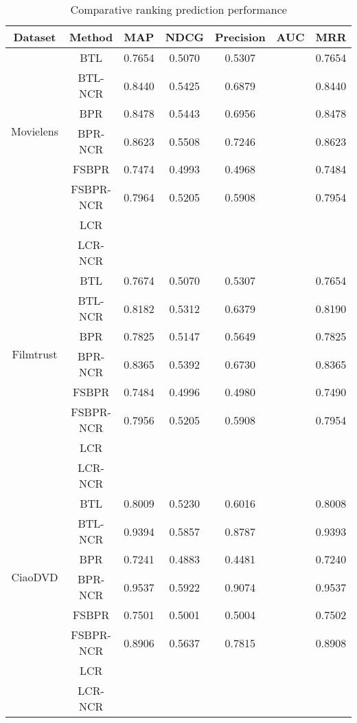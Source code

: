 \documentclass[letterpaper]{article} %
\begin{document}
\begin{table}[htp]
\tiny
\caption{Comparative ranking prediction performance}
\begin{center}
\begin{tabular}{|c|c|c|c|c|c|c|}
\hline
Dataset & Method & MAP & NDCG & Precision & AUC & MRR \\\hline
\multirow{6}{*}{Movielens} & BTL &0.7654 &0.5070 &0.5307 & &0.7654 \\\cline{2-7}
 & BTL-NCR &0.8440 &0.5425 &0.6879 & &0.8440 \\\cline{2-7}
 & BPR &0.8478 &0.5443 &0.6956 & &0.8478 \\\cline{2-7}
 & BPR-NCR &0.8623 &0.5508 &0.7246 & &0.8623 \\\cline{2-7}
 & FSBPR &0.7474 &0.4993 &0.4968 & &0.7484 \\\cline{2-7}
  & FSBPR-NCR &0.7964 &0.5205 &0.5908 & &0.7954 \\\cline{2-7}
   & LCR & & & & & \\\cline{2-7}
 & LCR-NCR & & & & & \\\hline
\multirow{6}{*}{Filmtrust} & BTL &0.7674 &0.5070 &0.5307 & &0.7654 \\\cline{2-7}
 & BTL-NCR &0.8182 &0.5312 &0.6379 & &0.8190 \\\cline{2-7}
 & BPR &0.7825 &0.5147 &0.5649 & &0.7825  \\\cline{2-7}
 & BPR-NCR &0.8365 &0.5392 &0.6730 & &0.8365 \\\cline{2-7}
 & FSBPR &0.7484 &0.4996 &0.4980 & &0.7490 \\\cline{2-7}
  & FSBPR-NCR &0.7956 &0.5205 &0.5908 & &0.7954 \\\cline{2-7}
   & LCR & & & & & \\\cline{2-7}
 & LCR-NCR & & & & & \\\hline
\multirow{6}{*}{CiaoDVD} & BTL &0.8009 &0.5230 &0.6016 & &0.8008 \\\cline{2-7}
 & BTL-NCR &0.9394 &0.5857 &0.8787 & &0.9393 \\\cline{2-7}
 & BPR &0.7241 &0.4883 &0.4481 & &0.7240 \\\cline{2-7}
 & BPR-NCR &0.9537 &0.5922 &0.9074 & &0.9537 \\\cline{2-7}
 & FSBPR &0.7501 &0.5001 &0.5004 & &0.7502 \\\cline{2-7}
  & FSBPR-NCR &0.8906 &0.5637 &0.7815 & &0.8908 \\\cline{2-7}
   & LCR & & & & & \\\cline{2-7}
 & LCR-NCR & & & & & \\\hline
\end{tabular}
\end{center}
\label{tab:rankingresult}
\end{table}%
\end{document}
